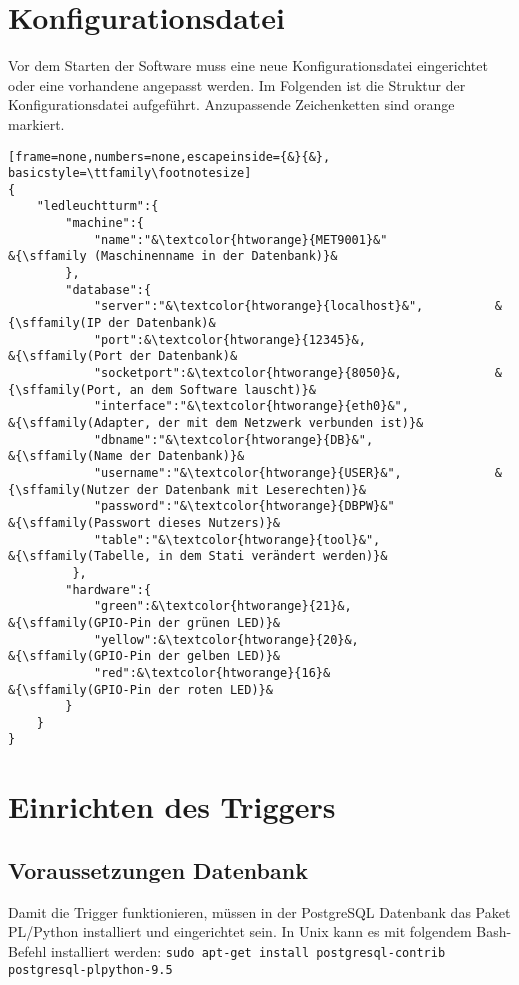 \documentclass{scrartcl}
\begin{document}
\section{Konfigurationsdatei}
Vor dem Starten der Software muss eine neue Konfigurationsdatei eingerichtet oder eine vorhandene angepasst werden. Im Folgenden ist die Struktur der Konfigurationsdatei aufgeführt. Anzupassende Zeichenketten sind orange markiert. 
\begin{lstlisting}[frame=none,numbers=none,escapeinside={&}{&}, basicstyle=\ttfamily\footnotesize]
{
	"ledleuchtturm":{
		"machine":{
			"name":"&\textcolor{htworange}{MET9001}&"						&{\sffamily (Maschinenname in der Datenbank)}&
		},
		"database":{
			"server":"&\textcolor{htworange}{localhost}&",		 	&{\sffamily(IP der Datenbank)&
			"port":&\textcolor{htworange}{12345}&,						 &{\sffamily(Port der Datenbank)&
			"socketport":&\textcolor{htworange}{8050}&,				&{\sffamily(Port, an dem Software lauscht)}&
			"interface":"&\textcolor{htworange}{eth0}&",				&{\sffamily(Adapter, der mit dem Netzwerk verbunden ist)}&
			"dbname":"&\textcolor{htworange}{DB}&",						&{\sffamily(Name der Datenbank)}&
			"username":"&\textcolor{htworange}{USER}&",				&{\sffamily(Nutzer der Datenbank mit Leserechten)}&
			"password":"&\textcolor{htworange}{DBPW}&"					&{\sffamily(Passwort dieses Nutzers)}&
			"table":"&\textcolor{htworange}{tool}&",						&{\sffamily(Tabelle, in dem Stati verändert werden)}&
		 },
		"hardware":{
			"green":&\textcolor{htworange}{21}&,								&{\sffamily(GPIO-Pin der grünen LED)}&
			"yellow":&\textcolor{htworange}{20}&,							&{\sffamily(GPIO-Pin der gelben LED)}&
			"red":&\textcolor{htworange}{16}&									&{\sffamily(GPIO-Pin der roten LED)}&
		}
	}
}
\end{lstlisting}

\section{Einrichten des Triggers}
\subsection{Voraussetzungen Datenbank}
Damit die Trigger funktionieren, müssen in der PostgreSQL Datenbank das Paket PL/Python installiert und eingerichtet sein. In Unix kann es mit folgendem Bash-Befehl installiert werden: \lstinline$sudo apt-get install postgresql-contrib postgresql-plpython-9.5$
\end{document}
